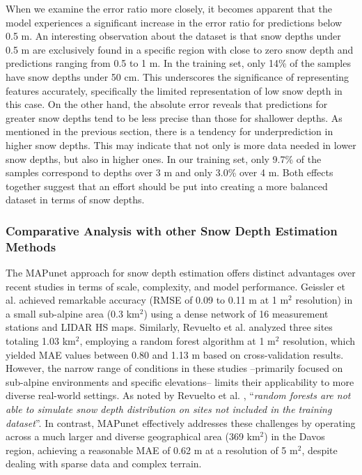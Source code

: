 \documentclass[preprint,12pt]{elsarticle}
\begin{document}
{When we examine the error ratio more closely, it becomes apparent that the model experiences a significant increase in the error ratio for predictions below 0.5 m. An interesting observation about the dataset is that snow depths under 0.5 m are exclusively found in a specific region with close to zero snow depth and predictions ranging from 0.5 to 1 m. In the training set, only 14\% of the samples have snow depths under 50 cm. This underscores the significance of representing features accurately, specifically the limited representation of low snow depth in this case. On the other hand, the absolute error reveals that predictions for greater snow depths tend to be less precise than those for shallower depths. As mentioned in the previous section, there is a tendency for underprediction in higher snow depths. This may indicate that not only is more data needed in lower snow depths, but also in higher ones. In our training set, only 9.7\% of the samples correspond to depths over 3 m and only 3.0\% over 4 m. Both effects together suggest that an effort should be put into creating a more balanced dataset in terms of snow depths.


\subsubsection{Comparative Analysis with other Snow Depth Estimation Methods}

The MAPunet approach for snow depth estimation offers distinct advantages over recent studies in terms of scale, complexity, and model performance. Geissler et al. \cite{Geissler2023} achieved remarkable accuracy (RMSE of 0.09 to 0.11 m at 1 m$^2$ resolution) in a small sub-alpine area (0.3 km$^2$) using a dense network of 16 measurement stations and LIDAR HS maps. Similarly, Revuelto et al. \cite{revuelto2020random} analyzed three sites totaling 1.03 km$^2$, employing a random forest algorithm at 1 m$^2$ resolution, which yielded MAE values between 0.80 and 1.13 m based on cross-validation results. However, the narrow range of conditions in these studies --primarily focused on sub-alpine environments and specific elevations-- limits their applicability to more diverse real-world settings. As noted by Revuelto et al. \cite{revuelto2020random}, ``\textit{random forests are not able to simulate snow depth distribution on sites not included in the training dataset}''. In contrast, MAPunet effectively addresses these challenges by operating across a much larger and diverse geographical area (369 km$^2$) in the Davos region, achieving a reasonable MAE of 0.62 m at a resolution of 5 m$^2$, despite dealing with sparse data and complex terrain.

}
\end{document}
